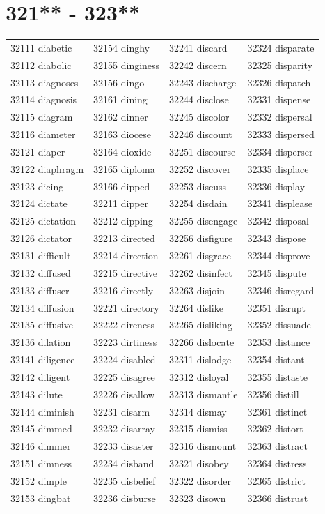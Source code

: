 \documentclass[10pt, oneside]{book}
\begin{document}
\begin{table}
	\centering
	\section*{321** - 323**}
	\begin{tabular}{l l l l}
32111 diabetic &32154 dinghy &32241 discard &32324 disparate\\
32112 diabolic &32155 dinginess &32242 discern &32325 disparity\\
32113 diagnoses &32156 dingo &32243 discharge &32326 dispatch\\
32114 diagnosis &32161 dining &32244 disclose &32331 dispense\\
32115 diagram &32162 dinner &32245 discolor &32332 dispersal\\
32116 diameter &32163 diocese &32246 discount &32333 dispersed\\
32121 diaper &32164 dioxide &32251 discourse &32334 disperser\\
32122 diaphragm &32165 diploma &32252 discover &32335 displace\\
32123 dicing &32166 dipped &32253 discuss &32336 display\\
32124 dictate &32211 dipper &32254 disdain &32341 displease\\
32125 dictation &32212 dipping &32255 disengage &32342 disposal\\
32126 dictator &32213 directed &32256 disfigure &32343 dispose\\
32131 difficult &32214 direction &32261 disgrace &32344 disprove\\
32132 diffused &32215 directive &32262 disinfect &32345 dispute\\
32133 diffuser &32216 directly &32263 disjoin &32346 disregard\\
32134 diffusion &32221 directory &32264 dislike &32351 disrupt\\
32135 diffusive &32222 direness &32265 disliking &32352 dissuade\\
32136 dilation &32223 dirtiness &32266 dislocate &32353 distance\\
32141 diligence &32224 disabled &32311 dislodge &32354 distant\\
32142 diligent &32225 disagree &32312 disloyal &32355 distaste\\
32143 dilute &32226 disallow &32313 dismantle &32356 distill\\
32144 diminish &32231 disarm &32314 dismay &32361 distinct\\
32145 dimmed &32232 disarray &32315 dismiss &32362 distort\\
32146 dimmer &32233 disaster &32316 dismount &32363 distract\\
32151 dimness &32234 disband &32321 disobey &32364 distress\\
32152 dimple &32235 disbelief &32322 disorder &32365 district\\
32153 dingbat &32236 disburse &32323 disown &32366 distrust\\
	\end{tabular}
 \end{table}
\clearpage
\end{document}

